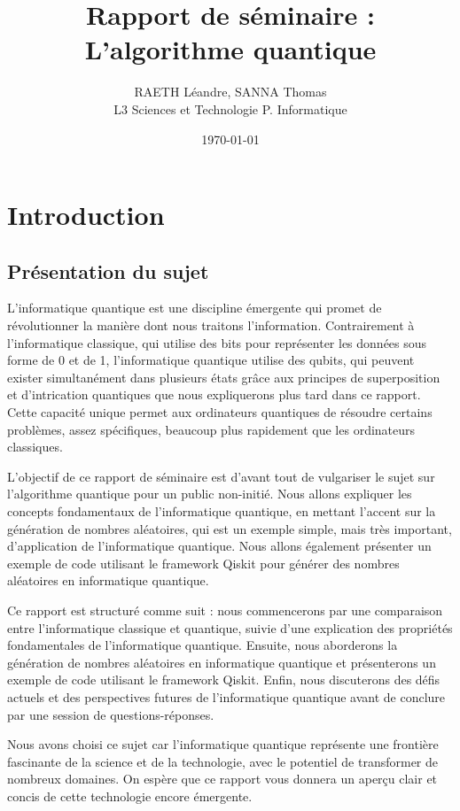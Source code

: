 \documentclass{article}
\title{Rapport de séminaire :\\L'algorithme quantique}
\author{RAETH Léandre, SANNA Thomas\\L3 Sciences et Technologie  P. Informatique}
\date{\today}
\begin{document}
\maketitle

\tableofcontents

\break\section{Introduction}
\subsection{Présentation du sujet}

L'informatique quantique est une discipline émergente qui promet de \\révolutionner la manière dont nous traitons l'information. Contrairement à l'informatique classique, qui utilise des bits pour représenter les données sous forme de 0 et de 1, l'informatique quantique utilise des qubits, qui peuvent exister simultanément dans plusieurs états grâce aux principes de superposition et d'intrication quantiques que nous expliquerons plus tard dans ce rapport. Cette capacité unique permet aux ordinateurs quantiques de résoudre certains problèmes, assez spécifiques, beaucoup plus rapidement que les ordinateurs classiques.

L'objectif de ce rapport de séminaire est d'avant tout de vulgariser le sujet sur l'algorithme quantique pour un public non-initié. Nous allons expliquer les concepts fondamentaux de l'informatique quantique, en mettant l'accent sur la génération de nombres aléatoires, qui est un exemple simple, mais très important, d'application de l'informatique quantique. Nous allons également présenter un exemple de code utilisant le framework Qiskit pour générer des nombres aléatoires en informatique quantique.

Ce rapport est structuré comme suit : nous commencerons par une comparaison entre l'informatique classique et quantique, suivie d'une explication des propriétés fondamentales de l'informatique quantique. Ensuite, nous aborderons la génération de nombres aléatoires en informatique quantique et présenterons un exemple de code utilisant le framework Qiskit. Enfin, nous discuterons des défis actuels et des perspectives futures de l'informatique quantique avant de conclure par une session de questions-réponses.

Nous avons choisi ce sujet car l'informatique quantique représente une frontière fascinante de la science et de la technologie, avec le potentiel de transformer de nombreux domaines. On espère que ce rapport vous donnera un aperçu clair et concis de cette technologie encore émergente.
\end{document}
